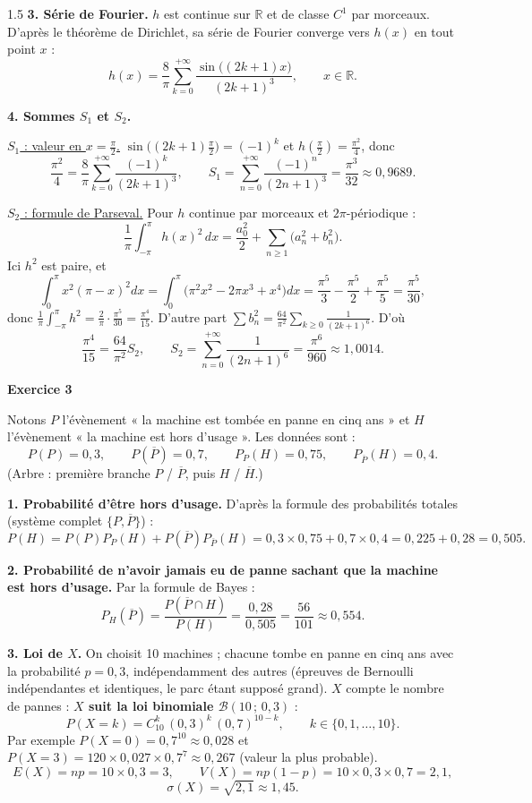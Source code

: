 \documentclass[12pt]{article}
\begin{document}
\begin{spacing}{1.5}
\textbf{3. Série de Fourier.} $h$ est continue sur $\mathbb{R}$ et de classe $C^1$ par morceaux. D'après le théorème de Dirichlet, sa série de Fourier converge vers $h(x)$ en tout point $x$ :
\[
\boxed{h(x)=\frac8\pi\sum_{k=0}^{+\infty}\frac{\sin\big((2k+1)x\big)}{(2k+1)^3}},\qquad x\in\mathbb{R}.
\]

\textbf{4. Sommes $S_1$ et $S_2$.}

\underline{$S_1$ : valeur en $x=\frac\pi2$.} $\sin\big((2k+1)\frac\pi2\big)=(-1)^k$ et $h(\frac\pi2)=\frac{\pi^2}{4}$, donc
\[
\frac{\pi^2}{4}=\frac8\pi\sum_{k=0}^{+\infty}\frac{(-1)^k}{(2k+1)^3},\qquad\boxed{S_1=\sum_{n=0}^{+\infty}\frac{(-1)^n}{(2n+1)^3}=\frac{\pi^3}{32}\approx0{,}9689}.
\]

\underline{$S_2$ : formule de Parseval.} Pour $h$ continue par morceaux et $2\pi$-périodique :
\[
\frac1\pi\int_{-\pi}^{\pi}h(x)^2\,dx=\frac{a_0^2}{2}+\sum_{n\ge1}\big(a_n^2+b_n^2\big).
\]
Ici $h^2$ est paire, et
\[
\int_0^\pi x^2(\pi-x)^2dx=\int_0^\pi\big(\pi^2x^2-2\pi x^3+x^4\big)dx=\frac{\pi^5}{3}-\frac{\pi^5}{2}+\frac{\pi^5}{5}=\frac{\pi^5}{30},
\]
donc $\frac1\pi\int_{-\pi}^\pi h^2=\frac2\pi\cdot\frac{\pi^5}{30}=\frac{\pi^4}{15}$. D'autre part $\sum b_n^2=\frac{64}{\pi^2}\sum_{k\ge0}\frac1{(2k+1)^6}$. D'où
\[
\frac{\pi^4}{15}=\frac{64}{\pi^2}S_2,\qquad\boxed{S_2=\sum_{n=0}^{+\infty}\frac{1}{(2n+1)^6}=\frac{\pi^6}{960}\approx1{,}0014}.
\]

\medskip\textbf{Exercice 3}

Notons $P$ l'évènement « la machine est tombée en panne en cinq ans » et $H$ l'évènement « la machine est hors d'usage ». Les données sont :
\[
P(P)=0{,}3,\qquad P(\overline P)=0{,}7,\qquad P_P(H)=0{,}75,\qquad P_{\overline P}(H)=0{,}4 .
\]
(Arbre : première branche $P$ / $\overline P$, puis $H$ / $\overline H$.)

\textbf{1. Probabilité d'être hors d'usage.} D'après la formule des probabilités totales (système complet $\{P,\overline P\}$) :
\[
P(H)=P(P)P_P(H)+P(\overline P)P_{\overline P}(H)=0{,}3\times0{,}75+0{,}7\times0{,}4=0{,}225+0{,}28=\boxed{0{,}505}.
\]

\textbf{2. Probabilité de n'avoir jamais eu de panne sachant que la machine est hors d'usage.} Par la formule de Bayes :
\[
P_H(\overline P)=\frac{P(\overline P\cap H)}{P(H)}=\frac{0{,}28}{0{,}505}=\boxed{\frac{56}{101}\approx0{,}554}.
\]

\textbf{3. Loi de $X$.} On choisit 10 machines ; chacune tombe en panne en cinq ans avec la probabilité $p=0{,}3$, indépendamment des autres (épreuves de Bernoulli indépendantes et identiques, le parc étant supposé grand). $X$ compte le nombre de pannes : \textbf{$X$ suit la loi binomiale $\mathcal{B}(10\,;\,0{,}3)$} :
\[
P(X=k)=C_{10}^k\,(0{,}3)^k\,(0{,}7)^{10-k},\qquad k\in\{0,1,\dots,10\}.
\]
Par exemple $P(X=0)=0{,}7^{10}\approx0{,}028$ et $P(X=3)=120\times0{,}027\times0{,}7^7\approx0{,}267$ (valeur la plus probable).
\[
E(X)=np=10\times0{,}3=\boxed{3},\qquad V(X)=np(1-p)=10\times0{,}3\times0{,}7=\boxed{2{,}1},
\]
\[
\sigma(X)=\sqrt{2{,}1}\approx\boxed{1{,}45}.
\]

\end{spacing}
\end{document}
